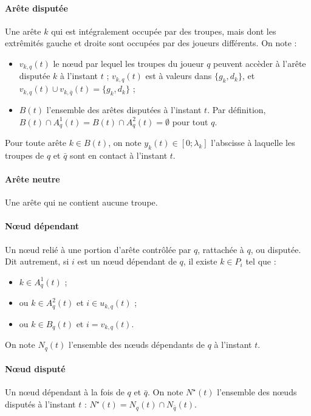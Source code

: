 \documentclass[a4paper,11pt,headings=normal]{scrartcl}
\theoremstyle{mythm}
\begin{document}
\paragraph{Arête disputée} Une arête $k$ qui est intégralement occupée
par des troupes, mais dont les extrêmités gauche et droite sont
occupées par des joueurs différents. On note :
\begin{itemize}
  \item $v_{k,q}(t)$ le nœud par lequel les troupes du joueur $q$
    peuvent accèder à l'arête disputée $k$ à l'instant $t$ ;
    $v_{k,q}(t)$ est à valeurs dans $\{g_k, d_k\}$, et
    $v_{k,q}(t) \cup v_{k,{\bar q}}(t) = \{g_k, d_k\}$ ;

  \item $B(t)$ l'ensemble des arêtes disputées à l'instant $t$. Par
    définition, $B(t) \cap A^1_q(t) = B(t) \cap A^2_q(t) = \emptyset$
    pour tout $q$.
\end{itemize}
Pour toute arête $k \in B(t)$, on note $y_k(t) \in [0 ; \lambda_k]$
l'abscisse à laquelle les troupes de $q$ et $\bar q$ sont en contact à
l'instant $t$.

\paragraph{Arête neutre} Une arête qui ne contient aucune
troupe.

\paragraph{Nœud dépendant} Un nœud relié à une portion d'arête contrôlée
par $q$, rattachée à $q$, ou disputée. Dit autrement, si $i$ est un
nœud dépendant de $q$, il existe $k \in P_i$ tel que :
\begin{itemize}
  \item $k \in A^1_q(t)$ ;

  \item ou $k \in A^2_q(t)$ et $i \in u_{k,q}(t)$ ;

  \item ou $k \in B_q(t)$ et $i = v_{k,q}(t)$.
\end{itemize}
On note $N_q(t)$ l'ensemble des nœuds dépendants de $q$ à l'instant
$t$.

\paragraph{Nœud disputé} Un nœud dépendant à la fois de $q$ et ${\bar q}$.
On note $N^\star(t)$ l'ensemble des nœuds disputés à l'instant $t$ :
$N^\star(t) = N_q(t) \cap N_{\bar q}(t)$.
\end{document}
